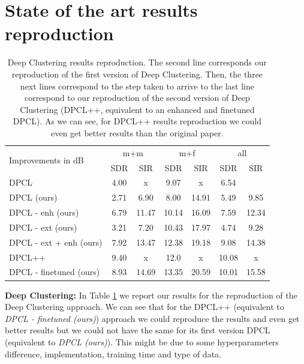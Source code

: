 \documentclass[master, tikz, final,11pt, dvipdfmx]{iscs-thesis}
\begin{document}
\section{State of the art results reproduction}
\label{sota}
\begin{table}[ht]
\centering
\begin{tabular}{l|c|c|c|c|c|c}
\multirow{2}{*}{Improvements in dB} & \multicolumn{2}{c|}{m+m} & \multicolumn{2}{c|}{m+f} & \multicolumn{2}{c}{all} \\ 
\cline{2-7} 
 & SDR & SIR & SDR & SIR & SDR & SIR \\ 
\hline 
DPCL \cite{DPCLV1} & 4.00 & x & 9.07 & x & 6.54 &  \\ 
DPCL (ours) & 2.71 & 6.90 & 8.00 & 14.91 & 5.49 & 9.85 
\\ 
\hline 
\hline 
DPCL - enh (ours) & 6.79 & 11.47 & 10.14 & 16.09 & 7.59 & 12.34 \\ 
DPCL - ext (ours) & 3.21 & 7.20 & 10.43 & 17.97 & 4.74 & 9.28 \\ 
DPCL - ext + enh (ours) & 7.92 & 13.47 & 12.38 & 19.18 & 9.08 & 14.38 \\ 
\hline 
\hline 
DPCL++ \cite{DPCLV2} & 9.40 & x & 12.0 & x & 10.08 & x \\ 
DPCL - finetuned (ours) &  8.93 & 14.69 & 13.35 & 20.59 & 10.01 & 15.58 \\ 
\end{tabular}
\caption[Deep Clustering results reproduction]{Deep Clustering results reproduction. The second line corresponds our reproduction of the first version of Deep Clustering. Then, the three next lines correspond to the step taken to arrive to the last line correspond to our reproduction of the second version of Deep Clustering (DPCL++, equivalent to an enhanced and finetuned DPCL). As we can see, for DPCL++ results reproduction we could even get better results than the original paper.}
\label{table:DPCLreprod}
\end{table}

\textbf{Deep Clustering:} In Table \ref{table:DPCLreprod} we report our results for the reproduction of the Deep Clustering approach. We can see that for the DPCL++ \cite{DPCLV2} (equivalent to \textit{DPCL - finetuned (ours)}) approach we could reproduce the results and even get better results but we could not have the same for its first version DPCL \cite{DPCLV1} (equivalent to \textit{DPCL (ours)}). This might be due to some hyperparameters difference, implementation, training time and type of data.
\end{document}
